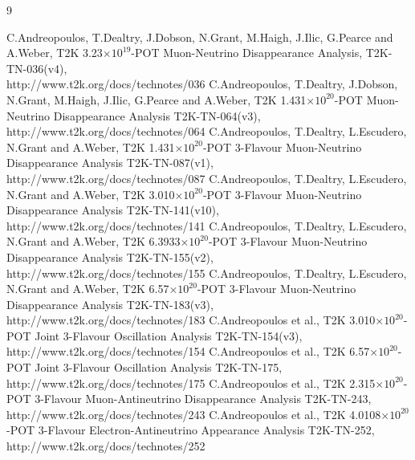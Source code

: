 %
%

\begin{thebibliography}{9}

%
%
   C.Andreopoulos, T.Dealtry, J.Dobson, N.Grant, M.Haigh, J.Ilic, G.Pearce and A.Weber,
   T2K 3.23$\times10^{19}$-POT Muon-Neutrino Disappearance Analysis,
   T2K-TN-036(v4),\\
   http://www.t2k.org/docs/technotes/036
   C.Andreopoulos, T.Dealtry, J.Dobson, N.Grant, M.Haigh, J.Ilic, G.Pearce and A.Weber,
   T2K 1.431$\times10^{20}$-POT Muon-Neutrino Disappearance Analysis
   T2K-TN-064(v3),\\
   http://www.t2k.org/docs/technotes/064
   C.Andreopoulos, T.Dealtry, L.Escudero, N.Grant and A.Weber,
   T2K 1.431$\times10^{20}$-POT 3-Flavour Muon-Neutrino Disappearance Analysis
   T2K-TN-087(v1),\\
   http://www.t2k.org/docs/technotes/087
   C.Andreopoulos, T.Dealtry, L.Escudero, N.Grant and A.Weber,
   T2K 3.010$\times10^{20}$-POT 3-Flavour Muon-Neutrino Disappearance Analysis
   T2K-TN-141(v10),\\
   http://www.t2k.org/docs/technotes/141
   C.Andreopoulos, T.Dealtry, L.Escudero, N.Grant and A.Weber,
   T2K 6.3933$\times10^{20}$-POT 3-Flavour Muon-Neutrino Disappearance Analysis
   T2K-TN-155(v2),\\
   http://www.t2k.org/docs/technotes/155
   C.Andreopoulos, T.Dealtry, L.Escudero, N.Grant and A.Weber,
   T2K 6.57$\times10^{20}$-POT 3-Flavour Muon-Neutrino Disappearance Analysis
   T2K-TN-183(v3),\\
   http://www.t2k.org/docs/technotes/183
   C.Andreopoulos et al.,
   T2K 3.010$\times10^{20}$-POT Joint 3-Flavour Oscillation Analysis
   T2K-TN-154(v3),\\
   http://www.t2k.org/docs/technotes/154
   C.Andreopoulos et al.,
   T2K 6.57$\times10^{20}$-POT Joint 3-Flavour Oscillation Analysis
   T2K-TN-175,\\
   http://www.t2k.org/docs/technotes/175
   C.Andreopoulos et al.,
   T2K 2.315$\times10^{20}$-POT 3-Flavour Muon-Antineutrino Disappearance Analysis
   T2K-TN-243,\\
   http://www.t2k.org/docs/technotes/243
   C.Andreopoulos et al.,
   T2K 4.0108$\times10^{20}$-POT 3-Flavour Electron-Antineutrino Appearance Analysis
   T2K-TN-252,\\
   http://www.t2k.org/docs/technotes/252


\end{thebibliography}
